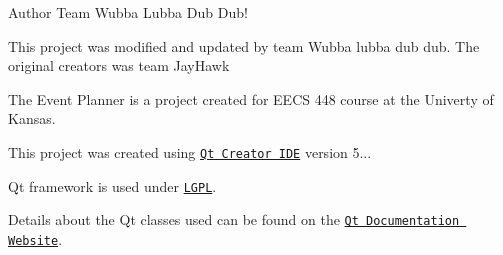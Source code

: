 \begin{DoxyAuthor}{Author}
Team Wubba Lubba Dub Dub!
\end{DoxyAuthor}
This project was modified and updated by team Wubba lubba dub dub. The original creators was team Jay\+Hawk

The Event Planner is a project created for E\+E\+CS 448 course at the Univerty of Kansas.

This project was created using \href{https://www.qt.io/qt-features-libraries-apis-tools-and-ide/}{\tt Qt Creator I\+DE} version 5...

Qt framework is used under \href{https://www.gnu.org/licenses/lgpl.txt}{\tt L\+G\+PL}.

Details about the Qt classes used can be found on the \href{http://doc.qt.io/qt-5/classes.html}{\tt Qt Documentation Website}. 